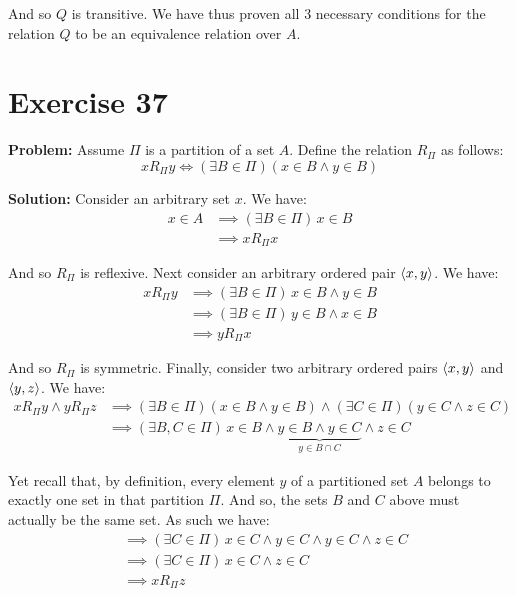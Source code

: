 \documentclass{article}
\begin{document}
And so $Q$ is transitive. We have thus proven all 3 necessary conditions for the relation $Q$ to be an equivalence relation over $A$.

\section*{Exercise 37}
\noindent\textbf{Problem:} Assume $\Pi$ is a partition of a set $A$. Define the relation $R_\Pi$ as follows:
\begin{equation*}
    xR_\Pi y\iff(\exists B\in\Pi)(x\in B\wedge y\in B)
\end{equation*}
\bigskip

\noindent\textbf{Solution:} Consider an arbitrary set $x$. We have:
\begin{align*}
    x\in A&\implies (\exists B\in\Pi)\,x\in B\tag{def. of partition}\\
    &\implies xR_\Pi x\tag{def. of $R_\Pi$}
\end{align*}

And so $R_\Pi$ is reflexive. Next consider an arbitrary ordered pair $\langle x,y\rangle$. We have:
\begin{align*}
    xR_\Pi y&\implies(\exists B\in\Pi)\,x\in B\wedge y\in B\tag{def. of $R_\Pi$}\\
    &\implies(\exists B\in\Pi)\,y\in B\wedge x\in B\\
    &\implies yR_\Pi x\tag{def. of $R_\Pi$}
\end{align*}

And so $R_\Pi$ is symmetric. Finally, consider two arbitrary ordered pairs $\langle x,y\rangle$ and $\langle y,z\rangle$. We have:
\begin{align*}
    xR_\Pi y\wedge yR_\Pi z&\implies(\exists B\in\Pi)(x\in B\wedge y\in B)\wedge (\exists C\in\Pi)(y\in C\wedge z\in C)\tag{def. of $R_\Pi$}\\
    &\implies(\exists B,C\in\Pi)\,x\in B\wedge \underbrace{y\in B\wedge y\in C}_{y\in B\cap C}\wedge z\in C
\end{align*}

Yet recall that, by definition, every element $y$ of a partitioned set $A$ belongs to exactly one set in that partition $\Pi$. And so, the sets $B$ and $C$ above must actually be the same set. As such we have:
\begin{align*}
    &\implies(\exists C\in\Pi)\,x\in C\wedge y\in C\wedge y\in C\wedge z\in C\tag{B=C}\\
    &\implies(\exists C\in\Pi)\,x\in C\wedge z\in C\\
    &\implies xR_\Pi z\tag{def. of $R_\Pi$}
\end{align*}
\end{document}
